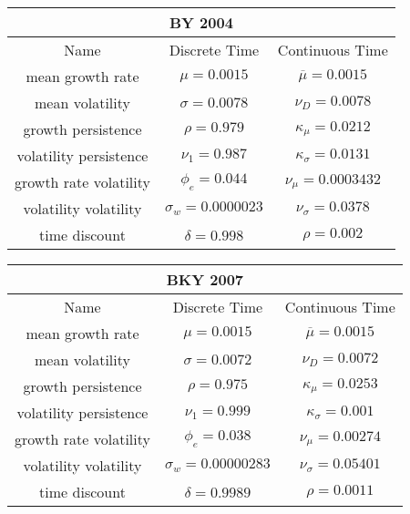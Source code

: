 \documentclass[english]{article}
\begin{document}
\begin{tabular}{|c|c|c|}
	\hline 
	\multicolumn{3}{|c|}{BY 2004}
	\\
	\hline 
	Name & Discrete Time & Continuous Time
	\\
	\hline 
	mean growth rate & $\mu =  0.0015$ &  $\overline{\mu} = 0.0015$
	\\
	\hline 
	mean volatility & $\sigma = 0.0078$ & $\nu_{D}=0.0078$
	\\
	\hline 
	growth persistence & $\rho = 0.979$ & $\kappa_{\mu}= 0.0212 $
	\\
	\hline 
	volatility persistence & $\nu_1 = 0.987$ & $\kappa_{\sigma}=0.0131$ 
	\\
	\hline 
	growth rate volatility &  $\phi_e = 0.044$ & $\nu_{\mu}= 0.0003432$
	\\
	\hline 
	volatility volatility & $\sigma_w = 0.0000023$ & $\nu_{\sigma}=0.0378$ 
	\\
	\hline 
	time discount & $\delta = 0.998$  & $\rho=0.002$
	\\
	\hline
\end{tabular}

\begin{tabular}{|c|c|c|}
	\hline 
	\multicolumn{3}{|c|}{BKY 2007}
	\\
	\hline
	Name & Discrete Time & Continuous Time 
	\\
	\hline 
	\hline 
	mean growth rate & $\mu =  0.0015$ &  $\overline{\mu} = 0.0015$
	\\
	\hline 
	mean volatility & $\sigma = 0.0072$ & $\nu_{D}=0.0072$
	\\
	\hline 
	growth persistence & $\rho = 0.975$ & $\kappa_{\mu}= 0.0253 $
	\\
	\hline 
	volatility persistence & $\nu_1 = 0.999$ & $\kappa_{\sigma}=0.001$ 
	\\
	\hline 
	growth rate volatility &  $\phi_e = 0.038$ & $\nu_{\mu}= 0.00274$
	\\
	\hline 
	volatility volatility & $\sigma_w = 0.00000283$ & $\nu_{\sigma}=0.05401$ 
	\\
	\hline 
	time discount & $\delta = 0.9989$  & $\rho=0.0011$
	\\
	\hline
\end{tabular}
\end{document}

